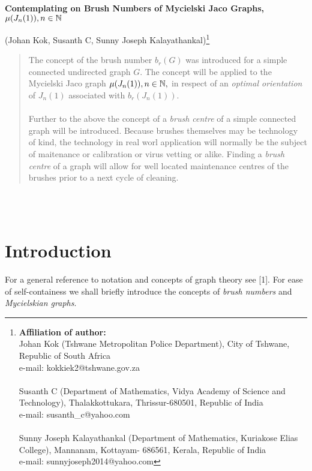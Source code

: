 \documentclass[11pt]{article}
\numberwithin{equation}{section}
\begin{document}
\begin{center}
{\Large{\textbf{Contemplating on Brush Numbers of Mycielski Jaco Graphs, $\mu(J_n(1)), n \in \Bbb N$}}} 
\end{center}
\vspace{0.5cm}
\large{\centerline{(Johan Kok, Susanth C, Sunny Joseph Kalayathankal)\footnote {\textbf {Affiliation of author:}\\
\noindent Johan Kok (Tshwane Metropolitan Police Department), City of Tshwane, Republic of South Africa\\
e-mail: kokkiek2@tshwane.gov.za\\ \\
\noindent Susanth C (Department of Mathematics, Vidya Academy of Science and Technology), Thalakkottukara, Thrissur-680501, Republic of India\\
e-mail: susanth\_c@yahoo.com\\ \\
\noindent Sunny Joseph Kalayathankal (Department of Mathematics, Kuriakose Elias College), Mannanam, Kottayam- 686561, Kerala, Republic of India\\
e-mail: sunnyjoseph2014@yahoo.com}}
\vspace{0.5cm}
\begin{abstract}
\noindent The concept of the brush number $b_r(G)$ was introduced for a simple connected undirected graph $G$. The concept will be applied to the Mycielski Jaco graph $\mu(J_n(1)), n \in \Bbb N,$  in respect of an \emph{optimal orientation} of $J_n(1)$ associated with $b_r(J_n(1))$.\\ \\
\noindent Further to the above the concept of a \emph{brush centre} of a simple connected graph will be introduced. Because brushes themselves may be technology of kind, the technology in real worl application will normally be the subject of maitenance or calibration or virus vetting or alike. Finding a \emph{brush centre} of a graph will allow for well located maintenance centres of the brushes prior to a next cycle of cleaning.
\end{abstract}
\\ \\
\section{Introduction}
\noindent  For a general reference to notation and concepts of graph theory see [1]. For ease of self-containess we shall briefly introduce the concepts of \emph{brush numbers} and \emph{Mycielskian graphs}.
}
\end{document}
